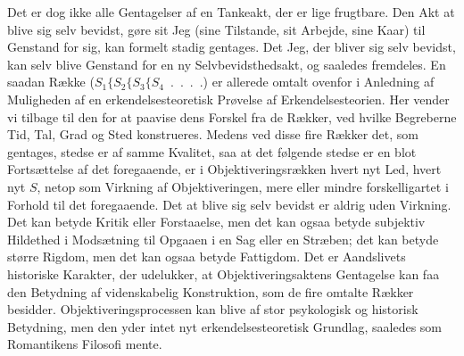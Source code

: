 \documentclass[12pt]{article}
\begin{document}
Det er dog ikke alle Gentagelser af en Tankeakt, der er lige frugtbare. Den
Akt at blive sig selv bevidst, gøre sit Jeg (sine Tilstande, sit Arbejde, sine
Kaar) til Genstand for sig, kan formelt stadig gentages. Det Jeg, der bliver
sig selv bevidst, kan selv blive Genstand for en ny Selvbevidsthedsakt, og
saaledes fremdeles. En
saadan Række ($S_1 \lbrace S_2 \lbrace S_3 \lbrace S_4$~.~.~.~.) er allerede omtalt ovenfor
i Anledning af Muligheden af en erkendelsesteoretisk Prøvelse af
Erkendelsesteorien. Her vender vi tilbage til den for at paavise dens Forskel
fra de Rækker, ved hvilke Begreberne Tid, Tal, Grad og Sted konstrueres.
Medens ved disse fire Rækker det, som gentages, stedse er af samme Kvalitet,
saa at det følgende stedse er en blot Fortsættelse af det foregaaende, er i
Objektiveringsrækken hvert nyt Led, hvert nyt $S$, netop som Virkning af
Objektiveringen, mere eller mindre forskelligartet i Forhold til det
foregaaende. Det at blive sig selv bevidst er aldrig uden Virkning. Det kan
betyde Kritik eller Forstaaelse, men det kan ogsaa betyde subjektiv Hildethed i
Modsætning til Opgaaen i en Sag eller en Stræben; det kan betyde større
Rigdom, men det kan ogsaa betyde Fattigdom. Det er Aandslivets historiske
Karakter, der udelukker, at Objektiveringsaktens Gentagelse kan faa den
Betydning af videnskabelig Konstruktion, som de fire omtalte Rækker besidder.
Objektiveringsprocessen kan blive af stor psykologisk og historisk Betydning,
men den yder intet nyt erkendelsesteoretisk Grundlag, saaledes som
Romantikens Filosofi mente.
\end{document}

